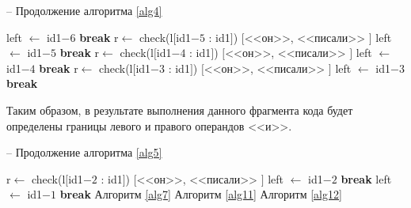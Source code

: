 \documentclass[main]{subfiles}
\begin{document}
\begin{algorithm}
	\caption{-- Продолжение алгоритма \ref{alg4}}\label{alg5}
	\begin{algorithmic}[1]
		\State left $\gets$ id1$-6$ 
		\State \textbf{break}
		\EndIf
		\EndIf
		\EndFor
		\EndIf
		\State r$\gets$ check(l$[$id1$-5$ : id1$]$)
		\State \Return $[$<<он>>, <<писали>> $]$
		\State left $\gets$ id1$-5$ 
		\State \textbf{break}
		\EndIf
		\EndIf
		\EndFor
		\EndIf
		\State r$\gets$ check(l$[$id1$-4$ : id1$]$)
		\State \Return $[$<<он>>, <<писали>> $]$
		\State left $\gets$ id1$-4$ 
		\State \textbf{break}
		\EndIf
		\EndIf
		\EndFor
		\EndIf
		\State r$\gets$ check(l$[$id1$-3$ : id1$]$)
\State \Return $[$<<он>>, <<писали>> $]$
\State left $\gets$ id1$-3$ 
\State \textbf{break}
\EndIf
\EndIf
\EndFor
		\EndIf
	\end{algorithmic}
\end{algorithm}
Таким образом, в результате выполнения данного фрагмента кода будет определены границы левого и правого операндов <<и>>.
\begin{algorithm}
	\caption{-- Продолжение алгоритма \ref{alg5}}\label{alg6}
	\begin{algorithmic}[1]
		\State r$\gets$ check(l$[$id1$-2$ : id1$]$)
		\State \Return $[$<<он>>, <<писали>> $]$
		\State left $\gets$ id1$-2$ 
		\State \textbf{break}
		\EndIf
		\EndIf
		\EndFor
		\EndIf
		\State left $\gets$ id1$-1$
		\State \textbf{break}
		\EndIf
		\EndFor
		\EndIf
		\EndIf
		\State Алгоритм \ref{alg7}
		\State Алгоритм \ref{alg11}
		\EndIf
		\State Алгоритм \ref{alg12}
		\EndFunction
	\end{algorithmic}
\end{algorithm}
\end{document}
